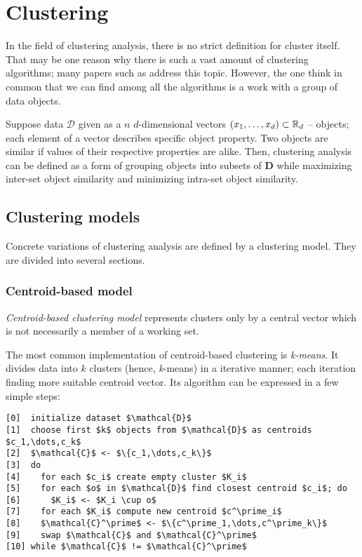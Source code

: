 \chapter{Clustering}

In the field of clustering analysis, there is no strict definition for cluster itself. That may be one reason why there is such a vast amount of clustering algorithms; many papers such as \cite{estivill2002so} address this topic.  However, the one think in common that we can find among all the algorithms is a work with a group of data objects.

Suppose data $\mathcal{D}$ given as a $n$ $d$-dimensional vectors $(x_1,\dots,x_d) \subset \mathbb{R}_d$  -- objects; each element of a vector describes specific object property. Two objects are similar if values of their respective properties are alike. Then, clustering analysis can be defined as a form of grouping objects into subsets of $\mathbf{D}$ while maximizing inter-set object similarity and minimizing intra-set object similarity.

\section{Clustering models}

Concrete variations of clustering analysis are defined by a clustering model. They are divided into several sections.

\subsection{Centroid-based model}

\emph{Centroid-based clustering model} represents clusters only by a central vector which is not necessarily a member of a working set. 

The most common implementation of centroid-based clustering is \emph{k-means}. It divides data into $k$ clusters (hence, \emph{k}-means) in a iterative manner; each iteration finding more suitable centroid vector. Its algorithm can be expressed in a few simple steps:

\begin{Verbatim}[commandchars=\\\{\},codes={\catcode`$=3\catcode`^=7\catcode`_=8},frame=lines,label=$k$-means]
[0]  initialize dataset $\mathcal{D}$
[1]  choose first $k$ objects from $\mathcal{D}$ as centroids $c_1,\dots,c_k$ 
[2]  $\mathcal{C}$ <- $\{c_1,\dots,c_k\}$
[3]  do
[4]    for each $c_i$ create empty cluster $K_i$
[5]    for each $o$ in $\mathcal{D}$ find closest centroid $c_i$; do
[6]      $K_i$ <- $K_i \cup o$
[7]    for each $K_i$ compute new centroid $c^\prime_i$
[8]    $\mathcal{C}^\prime$ <- $\{c^\prime_1,\dots,c^\prime_k\}$
[9]    swap $\mathcal{C}$ and $\mathcal{C}^\prime$
[10] while $\mathcal{C}$ != $\mathcal{C}^\prime$
\end{Verbatim}
  

